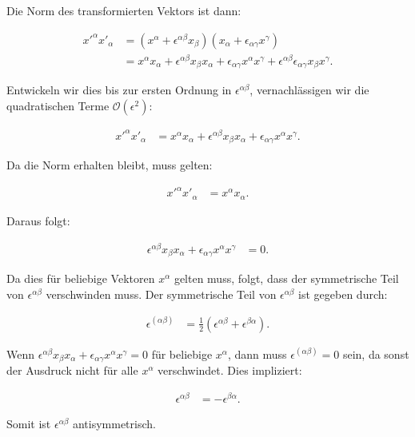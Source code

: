 \documentclass[11pt,a4paper]{article}
\begin{document}
Die Norm des transformierten Vektors ist dann:

\begin{align*}
x'^\alpha x'_\alpha &= (x^\alpha + \epsilon^{\alpha \beta} x_\beta)(x_\alpha + \epsilon_{\alpha \gamma} x^\gamma) \\
&= x^\alpha x_\alpha + \epsilon^{\alpha \beta} x_\beta x_\alpha + \epsilon_{\alpha \gamma} x^\alpha x^\gamma + \epsilon^{\alpha \beta} \epsilon_{\alpha \gamma} x_\beta x^\gamma.
\end{align*}

Entwickeln wir dies bis zur ersten Ordnung in $\epsilon^{\alpha \beta}$, vernachlässigen wir die quadratischen Terme $\mathcal{O}(\epsilon^2)$:

\begin{align*}
x'^\alpha x'_\alpha &= x^\alpha x_\alpha + \epsilon^{\alpha \beta} x_\beta x_\alpha + \epsilon_{\alpha \gamma} x^\alpha x^\gamma.
\end{align*}

Da die Norm erhalten bleibt, muss gelten:

\begin{align*}
x'^\alpha x'_\alpha &= x^\alpha x_\alpha.
\end{align*}

Daraus folgt:

\begin{align*}
\epsilon^{\alpha \beta} x_\beta x_\alpha + \epsilon_{\alpha \gamma} x^\alpha x^\gamma &= 0.
\end{align*}

Da dies für beliebige Vektoren $x^\alpha$ gelten muss, folgt, dass der symmetrische Teil von $\epsilon^{\alpha \beta}$ verschwinden muss. Der symmetrische Teil von $\epsilon^{\alpha \beta}$ ist gegeben durch:

\begin{align*}
\epsilon^{(\alpha \beta)} &= \frac{1}{2} (\epsilon^{\alpha \beta} + \epsilon^{\beta \alpha}).
\end{align*}

Wenn $\epsilon^{\alpha \beta} x_\beta x_\alpha + \epsilon_{\alpha \gamma} x^\alpha x^\gamma = 0$ für beliebige $x^\alpha$, dann muss $\epsilon^{(\alpha \beta)} = 0$ sein, da sonst der Ausdruck nicht für alle $x^\alpha$ verschwindet. Dies impliziert:

\begin{align*}
\epsilon^{\alpha \beta} &= -\epsilon^{\beta \alpha}.
\end{align*}

Somit ist $\epsilon^{\alpha \beta}$ antisymmetrisch.
\end{document}
